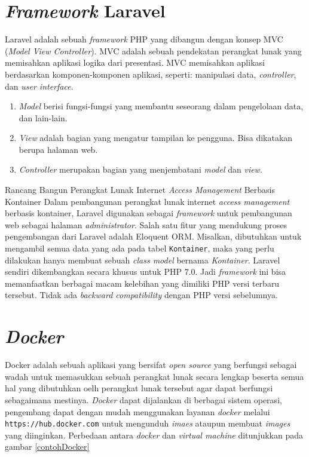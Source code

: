	\section{\textit{Framework} Laravel}
	
	Laravel adalah sebuah \textit{framework} PHP yang dibangun dengan konsep MVC (\textit{Model View Controller}). MVC adalah sebuah pendekatan perangkat lunak yang memisahkan aplikasi logika dari presentasi. MVC memisahkan aplikasi berdasarkan komponen-komponen aplikasi, seperti: manipulasi data, \textit{controller}, dan \textit{user interface}.
	\begin{enumerate}
	\item \textit{Model} berisi fungsi-fungsi yang membantu seseorang dalam pengelolaan data, dan lain-lain.
	\item \textit{View} adalah bagian yang mengatur tampilan ke pengguna. Bisa dikatakan berupa halaman web.
	\item \textit{Controller} merupakan bagian yang menjembatani \textit{model} dan \textit{view}.
	\end{enumerate}
	Rancang Bangun Perangkat Lunak Internet \textit{Access Management} Berbasis Kontainer
	Dalam pembangunan perangkat lunak internet \textit{access management} berbasis kontainer, Laravel digunakan sebagai \textit{framework} untuk pembangunan web sebagai halaman \textit{administrator}. Salah satu fitur yang mendukung proses pengembangan dari Laravel adalah Eloquent ORM. Misalkan, dibutuhkan untuk mengambil semua data yang ada pada tabel \texttt{Kontainer}, maka yang perlu dilakukan hanya membuat sebuah \textit{class model} bernama \textit{Kontainer}. Laravel sendiri dikembangkan secara khusus untuk PHP 7.0. Jadi \textit{framework} ini bisa memanfaatkan berbagai macam kelebihan yang dimiliki PHP versi terbaru tersebut. Tidak ada \textit{backward compatibility} dengan PHP versi sebelumnya.
	
		
	\section{\textit{Docker}}
	Docker adalah sebuah aplikasi yang bersifat \textit{open source} yang berfungsi sebagai wadah untuk memasukkan sebuah perangkat lunak secara lengkap beserta semua hal yang dibutuhkan oelh perangkat lunak tersebut agar dapat berfungsi sebagaimana mestinya. \textit{Docker} dapat dijalankan di berbagai sistem operasi, pengembang dapat dengan mudah menggunakan layanan \textit{docker} melalui \texttt{https://hub.docker.com} untuk mengunduh \textit{imaes} ataupun membuat \textit{images} yang diinginkan. Perbedaan antara \textit{docker} dan \textit{virtual machine} ditunjukkan pada gambar \ref{contohDocker}
	
